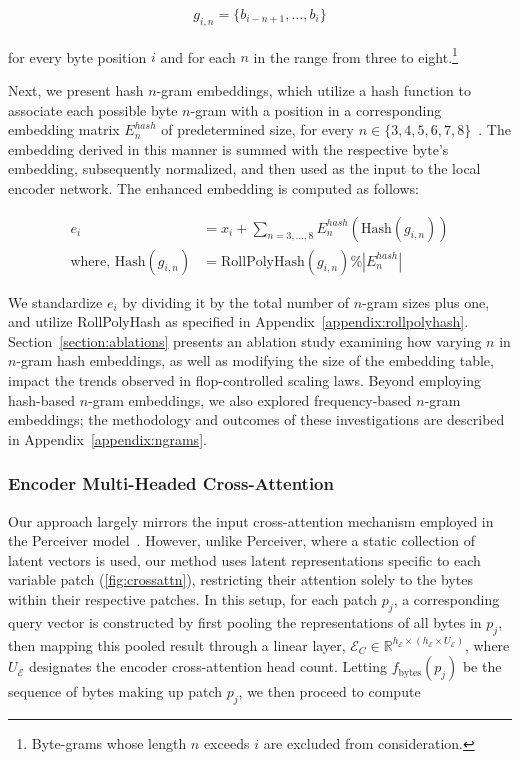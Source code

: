 \begin{align}
    g_{i,n}=\{b_{i-n + 1},\ldots, b_i\}
\end{align}

for every byte position $i$ and for each $n$ in the range from three to eight.\footnote{
Byte-grams whose length $n$ exceeds $i$ are excluded from consideration. }

Next, we present hash $n$-gram embeddings, which utilize a hash function to associate each possible byte $n$-gram with a position in a corresponding embedding matrix $E_{n}^{hash}$ of predetermined size, for every $n \in \{3,4,5,6,7,8\}$~\citep{bai2010learning}. The embedding derived in this manner is summed with the respective byte’s embedding, subsequently normalized, and then used as the input to the local encoder network. The enhanced embedding is computed as follows:

\begin{align}
e_i &= x_i + \sum_{n = 3,...,8}E_{n}^{hash}(\text{Hash}(g_{i,n})) \\
\text{where, Hash}(g_{i,n}) &= \text{RollPolyHash}(g_{i,n}) \% |E_{n}^{hash}|
\end{align}

We standardize $e_i$ by dividing it by the total number of $n$-gram sizes plus one, and utilize RollPolyHash as specified in Appendix~\ref{appendix:rollpolyhash}. Section~\ref{section:ablations} presents an ablation study examining how varying $n$ in $n$-gram hash embeddings, as well as modifying the size of the embedding table, impact the trends observed in flop-controlled scaling laws. Beyond employing hash-based $n$-gram embeddings, we also explored frequency-based $n$-gram embeddings; the methodology and outcomes of these investigations are described in Appendix~\ref{appendix:ngrams}.

\subsubsection{Encoder Multi-Headed Cross-Attention}
\label{sec:enc-cross-attn}
Our approach largely mirrors the input cross-attention mechanism employed in the Perceiver model~\citep{jaegle2021perceiver}. However, unlike Perceiver, where a static collection of latent vectors is used, our method uses latent representations specific to each variable patch (\autoref{fig:crossattn}), restricting their attention solely to the bytes within their respective patches. In this setup, for each patch $p_j$, a corresponding query vector is constructed by first pooling the representations of all bytes in $p_j$, then mapping this pooled result through a linear layer, $\mathcal{E}_{C} \in \mathbb{R}^{h_{\mathcal{E}} \times (h_{\mathcal{E}} \times U_{\mathcal{E}})}$, where $U_{\mathcal{E}}$ designates the encoder cross-attention head count. Letting $f_{\text{bytes}}(p_j)$ be the sequence of bytes making up patch $p_j$, we then proceed to compute

